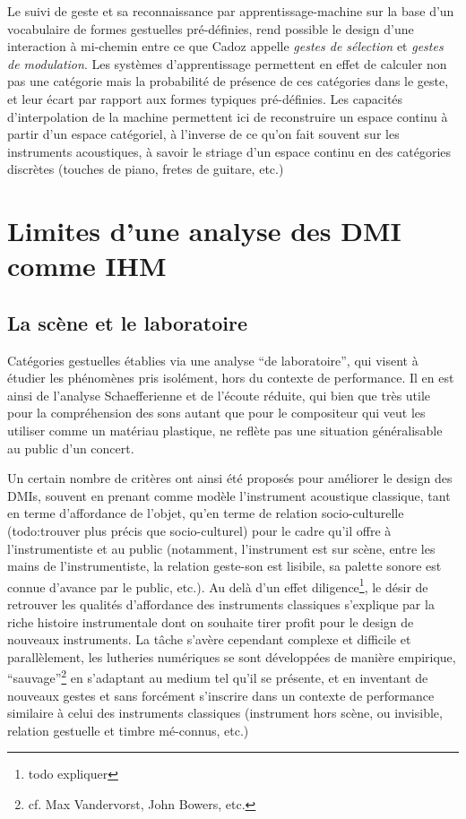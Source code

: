 \indent Le suivi de geste et sa reconnaissance par apprentissage-machine sur la base d'un vocabulaire de formes gestuelles pré-définies, rend possible le design d'une interaction à mi-chemin entre ce que Cadoz appelle \textit{gestes de sélection} et \textit{gestes de modulation}. Les systèmes d'apprentissage permettent en effet de calculer non pas une catégorie mais la probabilité de présence de ces catégories dans le geste, et leur écart par rapport aux formes typiques pré-définies. Les capacités d'interpolation de la machine permettent ici de reconstruire un espace continu à partir d'un espace catégoriel, à l'inverse de ce qu'on fait souvent sur les instruments acoustiques, à savoir le striage d'un espace continu en des catégories discrètes (touches de piano, fretes de guitare, etc.)


\section{Limites d'une analyse des DMI comme IHM}
\label{sec:gesture:limitesIHM}

\subsection{La scène et le laboratoire}
Catégories gestuelles établies via une analyse ``de laboratoire'', qui visent à étudier les phénomènes pris isolément, hors du contexte de performance. Il en est ainsi de l'analyse Schaefferienne et de l'écoute réduite, qui bien que très utile pour la compréhension des sons autant que pour le compositeur qui veut les utiliser comme un matériau plastique, ne reflète pas une situation généralisable au public d'un concert.

Un certain nombre de critères ont ainsi été proposés pour améliorer le design des DMIs, souvent en prenant comme modèle l'instrument acoustique classique, tant en terme d'affordance de l'objet, qu'en terme de relation socio-culturelle (todo:trouver plus précis que socio-culturel) pour le cadre qu'il offre à l'instrumentiste et au public (notamment, l'instrument est sur scène, entre les mains de l'instrumentiste, la relation geste-son est lisibile, sa palette sonore est connue d'avance par le public, etc.).
Au delà d'un effet diligence\footnote{todo expliquer}, le désir de retrouver les qualités d'affordance des instruments classiques s'explique par la riche histoire instrumentale dont on souhaite tirer profit pour le design de nouveaux instruments. La tâche s'avère cependant complexe et difficile et parallèlement, les lutheries numériques se sont développées de manière empirique, ``sauvage''\footnote{cf. Max Vandervorst, John Bowers, etc.} en s'adaptant au medium tel qu'il se présente, et en inventant de nouveaux gestes et sans forcément s'inscrire dans un contexte de performance similaire à celui des instruments classiques (instrument hors scène, ou invisible, relation gestuelle et timbre mé-connus, etc.)

